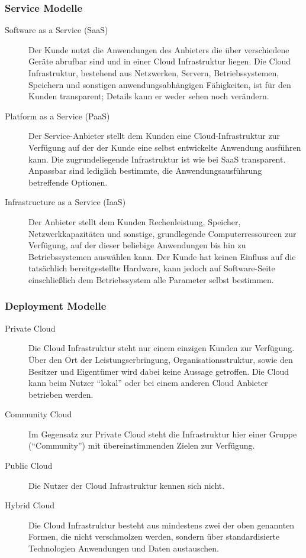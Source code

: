 \subsubsection{Service Modelle}
\begin{description}
	\item[Software as a Service (SaaS)] Der Kunde nutzt die Anwendungen des 
Anbieters die über verschiedene Geräte abrufbar
sind und in einer Cloud Infrastruktur liegen. Die Cloud Infrastruktur, 
bestehend aus Netzwerken, Servern, Betriebssystemen, Speichern und sonstigen 
anwendungsabhängigen Fähigkeiten, ist für den Kunden transparent; Details kann 
er weder sehen noch verändern.
	\item[Platform as a Service (PaaS)] Der Service-Anbieter stellt dem 
Kunden eine Cloud-Infrastruktur zur Verfügung auf der der Kunde eine selbst 
entwickelte Anwendung ausführen kann. Die zugrundeliegende Infrastruktur ist 
wie bei SaaS transparent. Anpassbar sind lediglich bestimmte, die 
Anwendungsausführung betreffende Optionen. 
	\item[Infrastructure as a Service (IaaS)] Der Anbieter stellt dem 
Kunden Rechenleistung, Speicher, 
Netzwerkkapazitäten und sonstige, grundlegende Computerressourcen zur 
Verfügung, auf der dieser beliebige Anwendungen bis hin zu Betriebssystemen 
auswählen kann. Der Kunde hat keinen Einfluss auf die tatsächlich 
bereitgestellte Hardware, kann jedoch auf Software-Seite einschließlich dem 
Betriebssystem alle Parameter selbst bestimmen.
\end{description}

\subsubsection{Deployment Modelle}
\begin{description}
	\item[Private Cloud] Die Cloud Infrastruktur steht nur einem einzigen 
Kunden zur Verfügung. Über den Ort der Leistungserbringung, 
Organisationsstruktur, sowie den Besitzer und Eigentümer wird dabei keine 
Aussage getroffen. Die Cloud kann beim Nutzer "`lokal"' oder bei einem anderen 
Cloud Anbieter betrieben werden.
	\item[Community Cloud] Im Gegensatz zur Private Cloud steht die 
Infrastruktur hier einer Gruppe ("`Community"') mit übereinstimmenden Zielen 
zur Verfügung.
	\item[Public Cloud] Die Nutzer der Cloud Infrastruktur kennen sich 
nicht. 
	\item[Hybrid Cloud] Die Cloud Infrastruktur besteht aus mindestens zwei 
der oben genannten Formen, die nicht verschmolzen werden, sondern über 
standardisierte Technologien Anwendungen und Daten austauschen.
\end{description}



